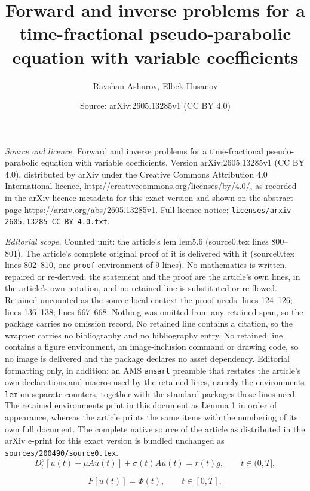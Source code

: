 \documentclass[10pt,a4paper]{amsart}
\title{Forward and inverse problems for a time-fractional pseudo-parabolic equation with variable coefficients}
\author{Ravshan Ashurov, Elbek Husanov}
\date{Source: arXiv:2605.13285v1 (CC BY 4.0)}
\begin{document}
\maketitle

\noindent\emph{Source and licence.} Forward and inverse problems for a time-fractional pseudo-parabolic equation with variable coefficients. Version arXiv:2605.13285v1 (CC BY 4.0), distributed by arXiv under the Creative Commons Attribution 4.0 International licence, http://creativecommons.org/licenses/by/4.0/, as recorded in the arXiv licence metadata for this exact version and shown on the abstract page https://arxiv.org/abs/2605.13285v1. Full licence notice: \texttt{licenses/arxiv-2605.13285-CC-BY-4.0.txt}.\par\smallskip

\noindent\textit{Editorial scope.} Counted unit: the article's lem lem5.6 (source0.tex lines 800--801). The article's complete original proof of it is delivered with it (source0.tex lines 802--810, one \texttt{proof} environment of 9 lines). No mathematics is written, repaired or re-derived: the statement and the proof are the article's own lines, in the article's own notation, and no retained line is substituted or re-flowed.  Retained uncounted as the source-local context the proof needs: lines 124--126; lines 136--138; lines 667--668.  Nothing was omitted from any retained span, so the package carries no omission record.  No retained line contains a citation, so the wrapper carries no bibliography and no bibliography entry.  No retained line contains a figure environment, an image-inclusion command or drawing code, so no image is delivered and the package declares no asset dependency.  Editorial formatting only, in addition: an AMS \texttt{amsart} preamble that restates the article's own declarations and macros used by the retained lines, namely the environments \texttt{lem} on separate counters, together with the standard packages those lines need.  The retained environments print in this document as Lemma 1 in order of appearance, whereas the article prints the same items with the numbering of its own full document.  The complete native source of the article as distributed in the arXiv e-print for this exact version is bundled unchanged as \texttt{sources/200490/source0.tex}.
\begin{equation} \label{1.1}
    D_t^{\rho} [u(t) + \mu Au(t)] + \sigma(t) Au(t) = r(t)g, \qquad t \in (0,T],
\end{equation}

\begin{equation} \label{1.3}
F[u(t)] = \Phi(t), \qquad t \in [0,T],
\end{equation}
\end{document}

